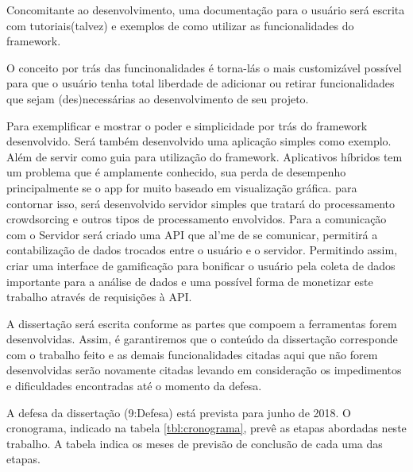 \documentclass[12pt]{report} %
\begin{document}
Concomitante ao desenvolvimento, uma documentação para o usuário será escrita com tutoriais(talvez) e exemplos de como utilizar as funcionalidades do framework. 

O conceito por trás das funcinonalidades é torna-lás o mais customizável possível para que o usuário tenha total liberdade de adicionar ou retirar funcionalidades que sejam (des)necessárias ao desenvolvimento de seu projeto. 

Para exemplificar e mostrar o poder e simplicidade por trás do framework desenvolvido. Será também desenvolvido uma aplicação simples como exemplo. Além de servir como guia para utilização do framework. Aplicativos híbridos tem um problema que é amplamente conhecido, sua perda de desempenho principalmente se o app for muito baseado em visualização gráfica. para contornar isso, será desenvolvido servidor simples que tratará do processamento crowdsorcing e outros tipos de processamento envolvidos. Para a comunicação com o Servidor será criado uma API que al'me de se comunicar, permitirá a contabilização de dados trocados entre o usuário e o servidor. Permitindo assim, criar uma interface de gamificação para bonificar o usuário pela coleta de dados importante para a análise de dados e uma possível forma de monetizar este trabalho através de requisições à API.

A dissertação será escrita conforme as partes que compoem a ferramentas forem desenvolvidas. Assim, é garantiremos que o conteúdo da dissertação corresponde com o trabalho feito e as demais funcionalidades citadas aqui que não forem desenvolvidas serão novamente citadas levando em consideração os impedimentos e dificuldades encontradas até o momento da defesa.

A defesa da dissertação (9:Defesa) está prevista para junho de 2018. O cronograma, indicado na tabela \ref{tbl:cronograma}, prevê as etapas abordadas neste trabalho. A tabela indica os meses de previsão de conclusão de cada uma das etapas.
\end{document}
